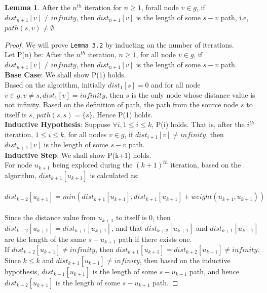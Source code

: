 \documentclass[11pt, oneside]{article}   	%
\theoremstyle{definition}
\newtheorem{sublemma}{Lemma}[section]
\begin{document}
\begin{sublemma}
After the $n^{th}$ iteration for $n \geq 1$, forall node $v \in g$, if $dist_{n+1}[v] \neq infinity$, then $dist_{n+1}[v]$ is the length of some $s-v$ path, i.e, $path(s, v) \neq \emptyset$.  
\end{sublemma}
\begin{proof}
We will prove \texttt{Lemma 3.2} by inducting on the number of iterations. 
\\
Let P(n) be: After the $n^{th}$ iteration, $n \geq 1$, for all node $v \in g$, if $dist_{n+1}[v] \neq infinity$, then $dist_{n+1}[v]$ is the length of some $s-v$ path. 
\\
\textbf{Base Case}: We shall show P(1) holds. 
\\
Based on the algorithm, initially $dist_1[s] = 0$ and for all node $v \in g, v \neq s, dist_1[v] = infinity$, then $s$ is the only node whose distance value is not infinity. Based on the definition of path, the path from the source node $s$ to itself is $s$, $path(s, s) = \{s\}$. Hence P(1) holds. 
\\
\textbf{Inductive Hypothesis}: Suppose $\forall i, 1 \leq i \leq k$, P(i) holds. That is, after the $i^{th}$ iteration, $1 \leq i \leq k$, for all nodes $v \in g$, if $dist_{i+1}[v] \neq infinity$, then $dist_{n+1}[v]$ is the length of some $s-v$ path. 
\\
\textbf{Inductive Step}: We shall show P(k+1) holds.
\\
For node $u_{k+1}$ being explored during the $(k+1)^{th}$ iteration, based on the algorithm, $dist_{k+1}[u_{k+1}]$ is calculated as: 
\\\\
      $dist_{k+2}[u_{k+1}] = min(dist_{k+1}[u_{k+1}], dist_{k+1}[u_{k+1}] + weight(u_{k+1},u_{k+1}))$
\\\\
Since the distance value from $u_{k+1}$ to itself is $0$, then $dist_{k+2}[u_{k+1}] = dist_{k+1}[u_{k+1}]$, and that $dist_{k+2}[u_{k+1}]$ and $dist_{k+1}[u_{k+1}]$ are the length of the same $s-u_{k+1}$ path if there exists one. 
\\
If $dist_{k+2}[u_{k+1}] \neq infinity$, then $dist_{k+1}[u_{k+1}] = dist_{k+2}[u_{k+1}] \neq infinity$. Since $k \leq k$ and $dist_{k+1}[u_{k+1}] \neq infinity$, then based on the inductive hypothesis, $dist_{k+1}[u_{k+1}]$ is the length of some $s-u_{k+1}$ path, and hence $dist_{k+2}[u_{k+1}]$ is the length of some $s-u_{k+1}$ path.

\end{proof}
\end{document}
